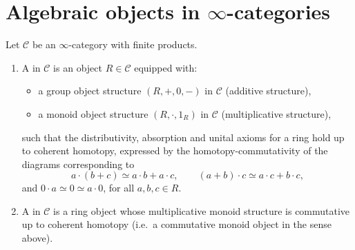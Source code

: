 






\section{Algebraic objects in \texorpdfstring{$\infty$}{infty}-categories}








\TODO{}

\begin{definition}
Let $\mathcal{C}$ be an $\infty$-category with finite products.
\begin{enumerate}
  \item A  in $\mathcal{C}$ is an object $R \in \mathcal{C}$ equipped with:
  \begin{itemize}
    \item a group object structure $(R,+,0,-)$ in $\mathcal{C}$ (additive structure),
    \item a monoid object structure $(R,\cdot,1_R)$ in $\mathcal{C}$ (multiplicative structure),
  \end{itemize}
  such that the distributivity, absorption and unital axioms for a ring hold up to coherent homotopy, expressed by the homotopy-commutativity of the diagrams corresponding to
  $$
  a \cdot (b + c) \simeq a \cdot b + a \cdot c,
  \qquad
  (a + b) \cdot c \simeq a \cdot c + b \cdot c,
  $$
  and $0 \cdot a \simeq 0 \simeq a \cdot 0$, for all $a,b,c \in R$.
  \item A  in $\mathcal{C}$ is a ring object whose multiplicative monoid structure is commutative up to coherent homotopy (i.e.\ a commutative monoid object in the sense above).
\end{enumerate}
\end{definition}

